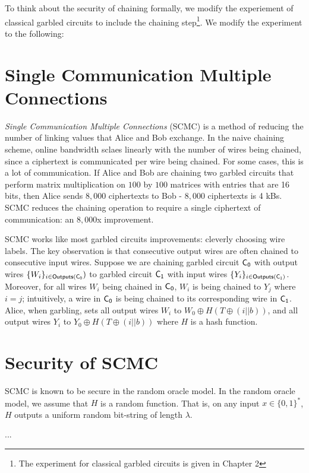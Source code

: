 To think about the security of chaining formally, we modify the experiement of classical garbled circuits to include the chaining step\footnote{The experiment for classical garbled circuits is given in Chapter 2}.
We modify the experiment to the following:


\section{Single Communication Multiple Connections}
\textit{Single Communication Multiple Connections} (SCMC) is a method of reducing the number of linking values that Alice and Bob exchange.
In the naive chaining scheme, online bandwidth sclaes linearly with the number of wires being chained, since a ciphertext is communicated per wire being chained.
For some cases, this is a lot of communication.
If Alice and Bob are chaining two garbled circuits that perform matrix multiplication on $100$ by $100$ matrices with entries that are 16 bits, then Alice sends $8,000$ ciphertexts to Bob - $8,000$ ciphertexts is 4 kBs.
SCMC reduces the chaining operation to require a single ciphertext of communication: an $8,000$x improvement.

SCMC works like most garbled circuits improvements: cleverly choosing wire labels.
The key observation is that consecutive output wires are often chained to consecutive input wires.
Suppose we are chaining garbled circuit $\sf {C}_0$ with output wires $\{W_i\}_{i \in {\sf {Outputs}}(\sf {C}_0})$ to garbled circuit $\sf {C}_1$ with input wires $\{Y_i\}_{i \in {\sf {Outputs}}(\sf {C}_1)}$.
Moreover, for all wires $W_i$ being chained in $\sf {C}_0$, $W_i$ is being chained to $Y_j$ where $i = j$; intuitively, a wire in $\sf {C}_0$ is being chained to its corresponding wire in $\sf {C}_1$.
Alice, when garbling, sets all output wires $W_i$ to $W_0 \oplus H(T \oplus (i || b))$, and all output wires $Y_i$ to $Y_0 \oplus H(T \oplus (i || b))$ where $H$ is a hash function.

\section{Security of SCMC}
SCMC is known to be secure in the random oracle model.
In the random oracle model, we assume that $H$ is a random function.
That is, on any input $x \in \{0,1\}^*$, $H$ outputs a uniform random bit-string of length $\lambda$.

...

